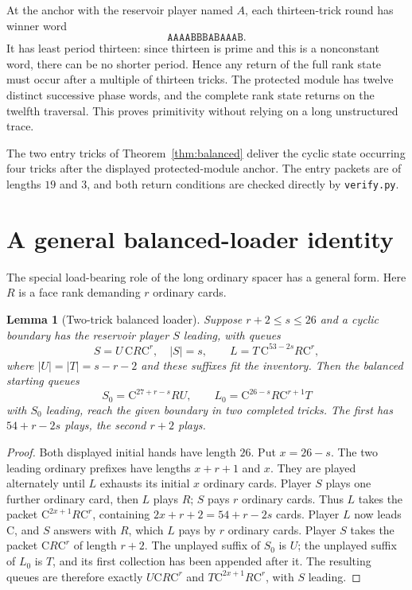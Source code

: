 \documentclass[11pt]{article}
\newtheorem{lemma}{Lemma}
\newcommand{\C}{\mathrm C}
\begin{document}
At the anchor with the reservoir player named $A$, each thirteen-trick
round has winner word
\[
\texttt{AAAABBBABAAAB}.
\]
It has least period thirteen: since thirteen is prime and this is a
nonconstant word, there can be no shorter period. Hence any return of the
full rank state must occur after a multiple of thirteen tricks. The
protected module has twelve distinct successive phase words, and the
complete rank state returns on the twelfth traversal. This proves
primitivity without relying on a long unstructured trace.

The two entry tricks of Theorem~\ref{thm:balanced} deliver the cyclic
state occurring four tricks after the displayed protected-module anchor.
The entry packets are of lengths $19$ and $3$, and both return conditions
are checked directly by \texttt{verify.py}.

\section{A general balanced-loader identity}
The special load-bearing role of the long ordinary spacer has a general
form. Here $R$ is a face rank demanding $r$ ordinary cards.

\begin{lemma}[Two-trick balanced loader]\label{lem:loader}
Suppose $r+2\le s\le26$ and a cyclic boundary has the reservoir player
$S$ leading, with queues
\[
S=U\,\C R\C^r,\quad |S|=s,\qquad
L=T\,\C^{53-2s}R\C^r,
\]
where $|U|=|T|=s-r-2$ and these suffixes fit the inventory.
Then the balanced starting queues
\[
\boxed{
S_0=\C^{27+r-s}RU,\qquad
L_0=\C^{26-s}R\C^{r+1}T
}
\]
with $S_0$ leading, reach the given boundary in two completed tricks. The
first has $54+r-2s$ plays, the second $r+2$ plays.
\end{lemma}
\begin{proof}
Both displayed initial hands have length $26$. Put $x=26-s$.
The two leading ordinary prefixes have lengths $x+r+1$ and $x$.
They are played alternately until $L$ exhausts its initial $x$
ordinary cards. Player $S$ plays one further ordinary card, then $L$
plays $R$; $S$ pays $r$ ordinary cards. Thus $L$ takes the
packet $\C^{2x+1}R\C^r$, containing $2x+r+2=54+r-2s$ cards.
Player $L$ now leads $\C$, and $S$ answers with $R$, which $L$
pays by $r$ ordinary cards. Player $S$ takes the packet
$\C R\C^r$ of length $r+2$. The unplayed suffix of $S_0$ is $U$;
the unplayed suffix of $L_0$ is $T$, and its first collection has been
appended after it. The resulting queues are therefore exactly
$U\C R\C^r$ and $T\C^{2x+1}R\C^r$, with $S$ leading.
\end{proof}
\end{document}
